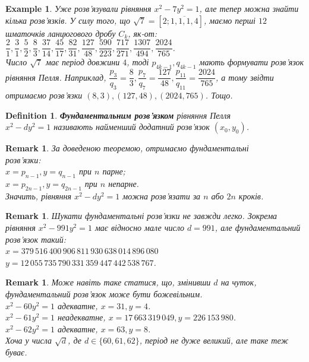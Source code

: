 \documentclass[a4paper, 10pt]{article}
\theoremstyle{theoremdd}
\theoremstyle{theoremdd}
\newtheorem{definition}[theorem]{Definition}
\theoremstyle{theoremdd}
\theoremstyle{theoremdd}
\newtheorem{example}[theorem]{Example}
\theoremstyle{theoremdd}
\theoremstyle{theoremdd}
\newtheorem{remark}[theorem]{Remark}
\theoremstyle{theoremdd}
\theoremstyle{theoremdd}
\begin{document}
\begin{example}
Уже розв'язували рівняння $x^2 - 7y^2 = 1$, але тепер можна знайти кілька розв'язків. У силу того, що $\sqrt{7} = [2;\overline{1,1,1,4}]$, маємо перші $12$ шматочків ланцюгового дробу $C_k$, як-от:\\
$\dfrac{2}{1}, \dfrac{3}{1}, \dfrac{5}{2}, \dfrac{8}{3}, \dfrac{37}{14}, \dfrac{45}{17}, \dfrac{82}{31}, \dfrac{127}{48}, \dfrac{590}{223}, \dfrac{717}{271}, \dfrac{1307}{494}, \dfrac{2024}{765}$.\\
Число $\sqrt{7}$ має період довжини $4$, тоді $p_{4k-1}, q_{4k-1}$ мають формувати розв'язок рівняння Пелля. Наприклад, $\dfrac{p_3}{q_3} = \dfrac{8}{3}, \dfrac{p_7}{q_7} = \dfrac{127}{48}, \dfrac{p_{11}}{q_{11}} = \dfrac{2024}{765}$, а тому звідти отримаємо розв'язки $(8,3), (127,48), (2024, 765)$. Тощо.
\end{example}

\begin{definition}
\textbf{Фундаментальним розв'язком} рівняння Пелля \\ $x^2 - dy^2 = 1$ називають найменший додатний розв'язок $(x_0,y_0)$.
\end{definition}

\begin{remark}
За доведеною теоремою, отримаємо фундаментальні \\ розв'язки:\\
$x = p_{n-1}, y = q_{n-1}$ при $n$ парне;\\
$x = p_{2n-1}, y = q_{2n-1}$ при $n$ непарне.\\
Значить, рівняння $x^2 - dy^2 = 1$ можна розв'язати за $n$ або $2n$ кроків.
\end{remark}

\begin{remark}
Шукати фундаментальні розв'язки не завжди легко. Зокрема рівняння $x^2 - 991y^2 = 1$ має відносно мале число $d = 991$, але фундаментальний розв'язок такий:\\
$x = 379\,516\,400\,906\,811\,930\,638\,014\,896\,080$\\
$y = 12\,055\,735\,790\,331\,359\,447\,442\,538\,767$.
\end{remark}

\begin{remark}
Може навіть таке статися, що, змінивши $d$ на чуток, фундаментальний розв'язок може бути божевільним.\\
$x^2 - 60y^2 = 1$ адекватне, $x = 31, y = 4$.\\
$x^2 - 61y^2 = 1$ неадекватне, $x = 17\,663\,319\,049, y = 226\,153\,980$.\\
$x^2 - 62y^2 = 1$ адекватне, $x = 63, y = 8$.\\
Хоча у числа $\sqrt{d}$, де $d \in \{60,61,62\}$, період не дуже великий, але таке теж буває.
\end{remark}
\end{document}
